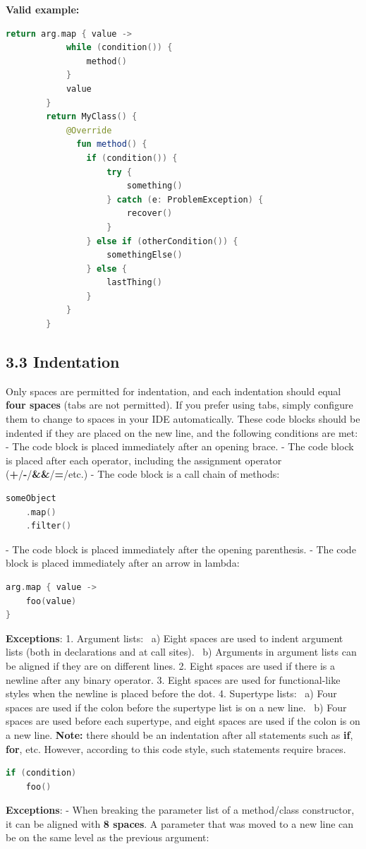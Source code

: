 \textbf{Valid example:}
\begin{lstlisting}[language=Kotlin]
        return arg.map { value ->
            while (condition()) {
                method()
            }
            value
        }
        return MyClass() {
            @Override
              fun method() {
                if (condition()) {
                    try {
                        something()
                    } catch (e: ProblemException) {
                        recover()
                    }
                } else if (otherCondition()) {
                    somethingElse()
                } else {
                    lastThing()
                }
            }
        }
\end{lstlisting}
\subsection*{\textbf{3.3 Indentation}}
\label{sec:3.3}
Only spaces are permitted for indentation, and each indentation should equal \textbf{four spaces} (tabs are not permitted).
If you prefer using tabs, simply configure them to change to spaces in your IDE automatically.
These code blocks should be indented if they are placed on the new line, and the following conditions are met:
-	The code block is placed immediately after an opening brace.
-	The code block is placed after each operator, including the assignment operator (\textbf{+}/\textbf{-}/\textbf{\&\&}/\textbf{=}/etc.)
-	The code block is a call chain of methods:
\begin{lstlisting}[language=Kotlin]
someObject
    .map()
    .filter()
\end{lstlisting}
-  The code block is placed immediately after the opening parenthesis.
-  The code block is placed immediately after an arrow in lambda:
\begin{lstlisting}[language=Kotlin]
arg.map { value ->
    foo(value)
}
\end{lstlisting}

\textbf{Exceptions}:
1.	Argument lists: \
a) Eight spaces are used to indent argument lists (both in declarations and at call sites). \
b) Arguments in argument lists can be aligned if they are on different lines.
2.	Eight spaces are used if there is a newline after any binary operator.
3.	Eight spaces are used for functional-like styles when the newline is placed before the dot.
4.	Supertype lists: \
a) Four spaces are used if the colon before the supertype list is on a new line. \
b) Four spaces are used before each supertype, and eight spaces are used if the colon is on a new line.
\textbf{Note:} there should be an indentation after all statements such as \textbf{if}, \textbf{for}, etc. However, according to this code style, such statements require braces.
\begin{lstlisting}[language=Kotlin]
if (condition)
    foo()
\end{lstlisting}
\textbf{Exceptions}:
- When breaking the parameter list of a method/class constructor, it can be aligned with \textbf{8 spaces}. A parameter that was moved to a new line can be on the same level as the previous argument:

